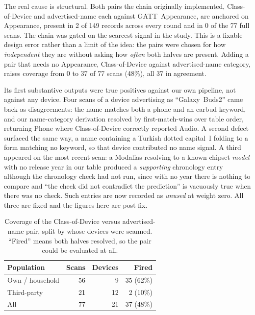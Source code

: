 \documentclass[conference]{IEEEtran}
\begin{document}
The real cause is structural. Both pairs the chain originally implemented,
Class-of-Device and advertised-name each against GATT~Appearance, are
anchored on Appearance, present in 2 of 149 records across every round and in
0 of the 77 full scans. The chain was gated on the scarcest signal in the
study. This is a fixable design error rather than a limit of the idea: the
pairs were chosen for how \emph{independent} they are without asking how
\emph{often} both halves are present. Adding a pair that needs no Appearance,
Class-of-Device against advertised-name category, raises coverage from 0 to
37 of 77 scans (48\%), all 37 in agreement.

Its first substantive outputs were true positives against our own pipeline,
not against any device. Four scans of a device advertising as
``Galaxy~Buds2'' came back as disagreements: the name matches both a phone
and an earbud keyword, and our name-category derivation resolved by
first-match-wins over table order, returning Phone where Class-of-Device
correctly reported Audio. A second defect surfaced the same way, a name
containing a Turkish dotted capital~I folding to a form matching no keyword,
so that device contributed no name signal. A third appeared on the most
recent scan: a Modalias resolving to a known chipset \emph{model} with no
release year in our table produced a \emph{supporting} chronology entry
although the chronology check had not run, since with no year there is
nothing to compare and ``the check did not contradict the prediction'' is
vacuously true when there was no check. Such entries are now recorded as
\emph{unused} at weight zero. All three are fixed and the figures here are
post-fix.

\begin{table}[t]
\centering
\footnotesize
\setlength{\tabcolsep}{5pt}
\renewcommand{\arraystretch}{1.15}
\caption{Coverage of the Class-of-Device versus advertised-name pair, split
by whose devices were scanned. ``Fired'' means both halves resolved, so the
pair could be evaluated at all.}
\label{tab:pairsplit}
\begin{tabular}{@{}>{\raggedright\arraybackslash}p{2.9cm} r r r@{}}
\toprule
\textbf{Population} & \textbf{Scans} & \textbf{Devices} & \textbf{Fired} \\
\midrule
Own / household & 56 & 9 & 35 (62\%) \\
Third-party & 21 & 12 & 2 (10\%) \\
\midrule
All & 77 & 21 & 37 (48\%) \\
\bottomrule
\end{tabular}
\end{table}
\end{document}
